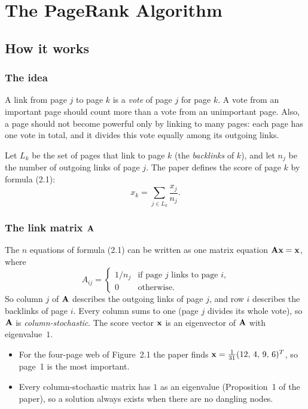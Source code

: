 \clearpage
\section{The PageRank Algorithm}

\subsection{How it works}

\subsubsection*{The idea}

A link from page $j$ to page $k$ is a \emph{vote} of page $j$ for page $k$.
A vote from an important page should count more than a vote from an unimportant page.
Also, a page should not become powerful only by linking to many pages: each page has one vote in total, and it divides this vote equally among its outgoing links.

Let $L_k$ be the set of pages that link to page $k$ (the \emph{backlinks} of $k$), and let $n_j$ be the number of outgoing links of page $j$.
The paper defines the score of page $k$ by formula (2.1):
\[
  x_k = \sum_{j \in L_k} \frac{x_j}{n_j}.
\]

\subsubsection*{The link matrix $\mathbf{A}$}

The $n$ equations of formula (2.1) can be written as one matrix equation $\mathbf{A}\mathbf{x} = \mathbf{x}$, where
\[
  A_{ij} = \begin{cases} 1/n_j & \text{if page $j$ links to page $i$,}\\ 0 & \text{otherwise.}\end{cases}
\]
So column $j$ of $\mathbf{A}$ describes the outgoing links of page $j$, and row $i$ describes the backlinks of page $i$.
Every column sums to one (page $j$ divides its whole vote), so $\mathbf{A}$ is \emph{column-stochastic}.
The score vector $\mathbf{x}$ is an eigenvector of $\mathbf{A}$ with eigenvalue~$1$.

\begin{itemize}
  \item For the four-page web of Figure~2.1 the paper finds $\mathbf{x} = \frac{1}{31}(12,\,4,\,9,\,6)^T$, so page~1 is the most important.
  \item Every column-stochastic matrix has $1$ as an eigenvalue (Proposition~1 of the paper), so a solution always exists when there are no dangling nodes.
\end{itemize}

